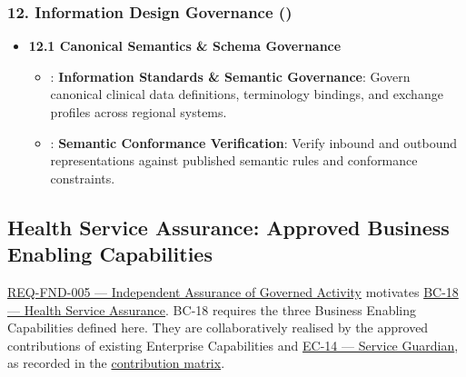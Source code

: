 \subsubsection*{12. Information Design Governance (\texttt{})}
\label{rad:enabling:668}

\begin{itemize}

\item 
\textbf{12.1 Canonical Semantics \& Schema Governance}


\begin{itemize}

\item 
\texttt{}: \textbf{Information Standards \& Semantic Governance}: Govern canonical clinical data definitions, terminology bindings, and exchange profiles across regional systems.



\item 
\texttt{}: \textbf{Semantic Conformance Verification}: Verify inbound and outbound representations against published semantic rules and conformance constraints.



\end{itemize}


\end{itemize}
\label{rad:enabling:672}

\par\smallskip
{}\label{rad:enabling:674}
\subsection*{Health Service Assurance: Approved Business Enabling Capabilities}
\label{rad:enabling:676}

\href{https://github.com/fhirfactory/harmonia/blob/98410db60155198a75f74c79d98060070209faa1/docs/markdown/01-motivation/requirements-constraints/foundational-requirements.md\#req-fnd-005-independent-assurance-of-governed-activity}{REQ-FND-005 — Independent Assurance of Governed Activity} motivates \hyperref[rad:business:1033]{BC-18 — Health Service Assurance}. BC-18 requires the three Business Enabling Capabilities defined here. They are collaboratively realised by the approved contributions of existing Enterprise Capabilities and \hyperref[rad:enterprise:224]{EC-14 — Service Guardian}, as recorded in the \hyperref[rad:assurance-strategy:54]{contribution matrix}.

